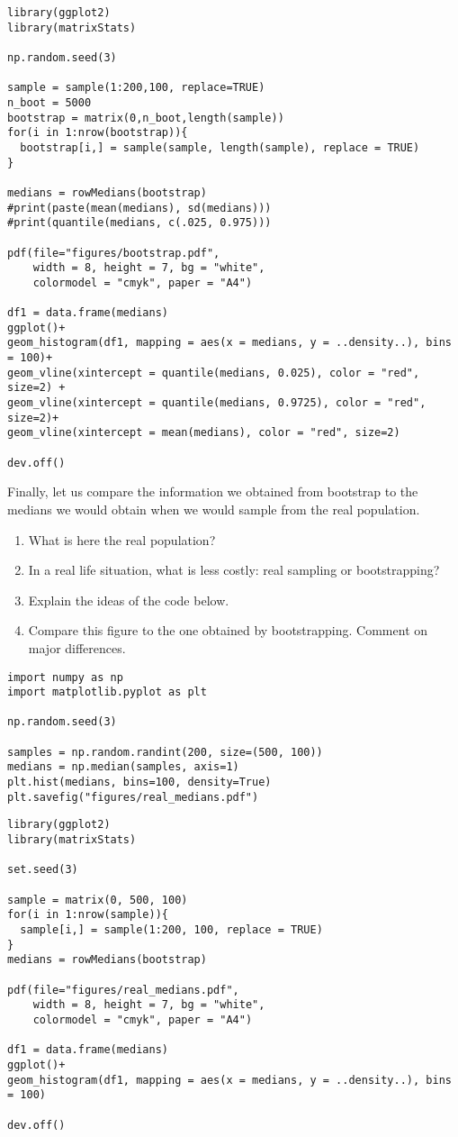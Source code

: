 \begin{verbatim}
library(ggplot2)
library(matrixStats)

np.random.seed(3)

sample = sample(1:200,100, replace=TRUE)
n_boot = 5000
bootstrap = matrix(0,n_boot,length(sample))
for(i in 1:nrow(bootstrap)){
  bootstrap[i,] = sample(sample, length(sample), replace = TRUE)
}

medians = rowMedians(bootstrap)
#print(paste(mean(medians), sd(medians)))
#print(quantile(medians, c(.025, 0.975)))

pdf(file="figures/bootstrap.pdf",
    width = 8, height = 7, bg = "white",          
    colormodel = "cmyk", paper = "A4")

df1 = data.frame(medians)
ggplot()+
geom_histogram(df1, mapping = aes(x = medians, y = ..density..), bins = 100)+
geom_vline(xintercept = quantile(medians, 0.025), color = "red", size=2) +
geom_vline(xintercept = quantile(medians, 0.9725), color = "red", size=2)+
geom_vline(xintercept = mean(medians), color = "red", size=2)

dev.off()
\end{verbatim}

\begin{exercise}
Finally, let us compare the information we obtained from bootstrap to the medians we would obtain when we would sample from the real population.
\begin{enumerate}
\item What is here the real population?
\item In a real life situation, what is less costly: real sampling or bootstrapping?
\item Explain the ideas of the code below.
\item Compare this figure to the one obtained by bootstrapping. Comment on major differences.
\end{enumerate}
\begin{verbatim}
import numpy as np
import matplotlib.pyplot as plt

np.random.seed(3)

samples = np.random.randint(200, size=(500, 100))
medians = np.median(samples, axis=1)
plt.hist(medians, bins=100, density=True)
plt.savefig("figures/real_medians.pdf")
\end{verbatim}

\begin{verbatim}
library(ggplot2)
library(matrixStats)

set.seed(3)

sample = matrix(0, 500, 100)
for(i in 1:nrow(sample)){
  sample[i,] = sample(1:200, 100, replace = TRUE)
}
medians = rowMedians(bootstrap)

pdf(file="figures/real_medians.pdf",
    width = 8, height = 7, bg = "white",          
    colormodel = "cmyk", paper = "A4")

df1 = data.frame(medians)
ggplot()+
geom_histogram(df1, mapping = aes(x = medians, y = ..density..), bins = 100)

dev.off()
\end{verbatim}
\end{exercise}





